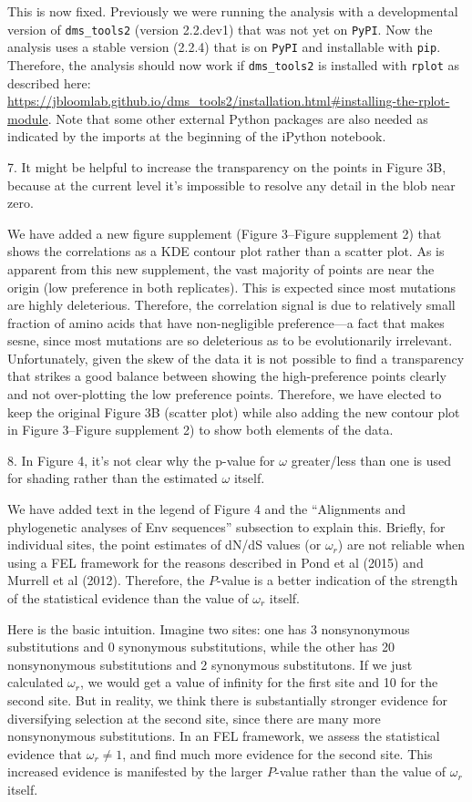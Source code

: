 \documentclass[11pt, oneside]{article}   	%
\begin{document}
{\color{black}
This is now fixed.
Previously we were running the analysis with a developmental version of \texttt{dms\_tools2} (version 2.2.dev1) that was not yet on \texttt{PyPI}.
Now the analysis uses a stable version (2.2.4) that is on \texttt{PyPI} and installable with \texttt{pip}.
Therefore, the analysis should now work if \texttt{dms\_tools2} is installed with \texttt{rplot} as described here: \url{https://jbloomlab.github.io/dms_tools2/installation.html#installing-the-rplot-module}.
Note that some other external Python packages are also needed as indicated by the imports at the beginning of the iPython notebook.
}

7. It might be helpful to increase the transparency on the points in Figure 3B, because at the current level it's impossible to resolve any detail in the blob near zero. 

{\color{black}
We have added a new figure supplement (Figure 3--Figure supplement 2) that shows the correlations as a KDE contour plot rather than a scatter plot.
As is apparent from this new supplement, the vast majority of points are near the origin (low preference in both replicates). 
This is expected since most mutations are highly deleterious.
Therefore, the correlation signal is due to relatively small fraction of amino acids that have non-negligible preference---a fact that makes sesne, since most mutations are so deleterious as to be evolutionarily irrelevant.
Unfortunately, given the skew of the data it is not possible to find a transparency that strikes a good balance between showing the high-preference points clearly and not over-plotting the low preference points.
Therefore, we have elected to keep the original Figure 3B (scatter plot) while also adding the new contour plot in Figure 3--Figure supplement 2) to show both elements of the data.
}

8. In Figure 4, it's not clear why the p-value for $\omega$ greater/less than one is used for shading rather than the estimated $\omega$ itself. 

{\color{black}
We have added text in the legend of Figure 4 and the ``Alignments and phylogenetic analyses of Env sequences'' subsection to explain this.
Briefly, for individual sites, the point estimates of dN/dS values (or $\omega_r$) are not reliable when using a FEL framework for the reasons described in Pond et al (2015) and Murrell et al (2012).
Therefore, the $P$-value is a better indication of the strength of the statistical evidence than the value of $\omega_r$ itself.

Here is the basic intuition. 
Imagine two sites: one has 3 nonsynonymous substitutions and 0 synonymous substitutions, while the other has 20 nonsynonymous substitutions and 2 synonymous substitutons.
If we just calculated $\omega_r$, we would get a value of infinity for the first site and 10 for the second site.
But in reality, we think there is substantially stronger evidence for diversifying selection at the second site, since there are many more nonsynonymous substitutions.
In an FEL framework, we assess the statistical evidence that $\omega_r \ne 1$, and find much more evidence for the second site.
This increased evidence is manifested by the larger $P$-value rather than the value of $\omega_r$ itself.}
\end{document}

